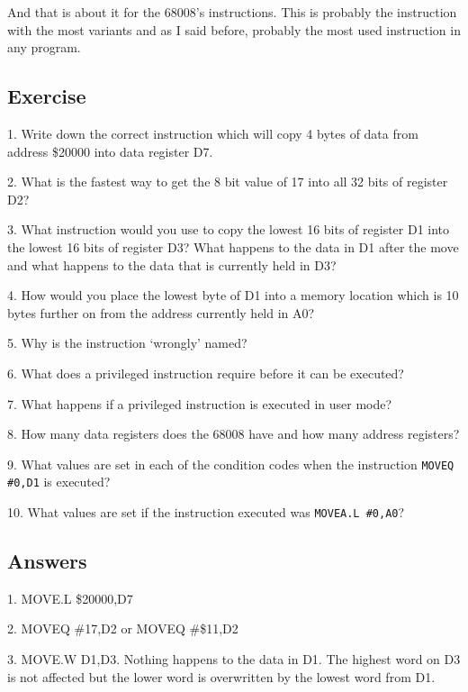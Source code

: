 And that is about it for the 68008's  instructions. This is
    probably the instruction with the most variants and as I said before,
    probably the most used instruction in any program.

\subsection{Exercise}
\label{ch2-exercise-1}%

1. Write down the correct instruction which will copy 4 bytes of
      data from address \$20000 into data register D7.

2. What is the fastest way to get the 8 bit value of 17 into all
      32 bits of register D2?

3. What instruction would you use to copy the lowest 16 bits of
      register D1 into the lowest 16 bits of register D3? What happens to the
      data in D1 after the move and what happens to the data that is currently
      held in D3?

4. How would you place the lowest byte of D1 into a memory
      location which is 10 bytes further on from the address currently held in
      A0?

5. Why is the  instruction `wrongly' named?

6. What does a privileged instruction require before it can be
      executed?

7. What happens if a privileged instruction is executed in user
      mode?

8. How many data registers does the 68008 have and how many
      address registers?

9. What values are set in each of the condition codes when the
      instruction \lstinline{MOVEQ #0,D1} is executed?

10. What values are set if the instruction executed was \lstinline{MOVEA.L #0,A0}?

\subsection{Answers}
\label{ch2-ch2-answers-1}%

1. MOVE.L \$20000,D7

2. MOVEQ \#17,D2 or MOVEQ \#\$11,D2

3. MOVE.W D1,D3. Nothing happens to the data in D1. The highest
      word on D3 is not affected but the lower word is overwritten by the
      lowest word from D1.

